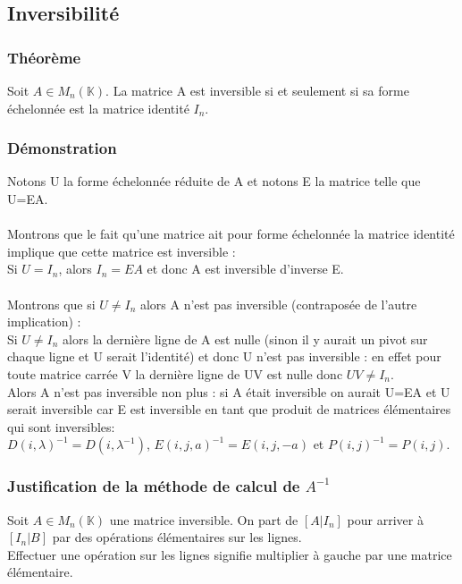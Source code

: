 \documentclass[a4paper,10pt]{book} %
\newcommand{\K}{\mathbb{K}}
\begin{document}
\newpage

\subsection{Inversibilité}
\subsubsection{Théorème}
Soit $A\in M_n(\K)$. La matrice A est inversible si et seulement si sa forme échelonnée est la matrice identité $I_n$.

\subsubsection{Démonstration}
Notons U la forme échelonnée réduite de A et notons E la matrice telle que U=EA.\\\\

Montrons que le fait qu'une matrice ait pour forme échelonnée la matrice identité implique que cette matrice est inversible :\\
Si $U=I_n$, alors $I_n=EA$ et donc A est inversible d'inverse E.\\\\

Montrons que si $U\neq I_n$ alors A n'est pas inversible (contraposée de l'autre implication) :\\

Si $U\neq I_n$ alors la dernière ligne de A est nulle (sinon il y aurait un pivot sur chaque ligne et U serait l'identité) et donc U n'est pas inversible : en effet pour toute matrice carrée V la dernière ligne de UV est nulle donc $UV\neq I_n$.\\

Alors A n'est pas inversible non plus : si A était inversible on aurait U=EA et U serait inversible car E est inversible en tant que produit de matrices élémentaires qui sont inversibles:\\
$D(i,\lambda)^{-1}=D(i,\lambda^{-1})$, $E(i,j,a)^{-1}=E(i,j,-a)$ et $P(i,j)^{-1}=P(i,j)$.

\subsubsection{Justification de la méthode de calcul de $A^{-1}$\label{InverseMatrice}}
Soit $A \in M_n(\K)$ une matrice inversible. On part de $[A|I_n]$ pour arriver à $[I_n|B]$ par des opérations élémentaires sur les lignes.\\
Effectuer une opération sur les lignes signifie multiplier à gauche par une matrice élémentaire.\\
\end{document}
